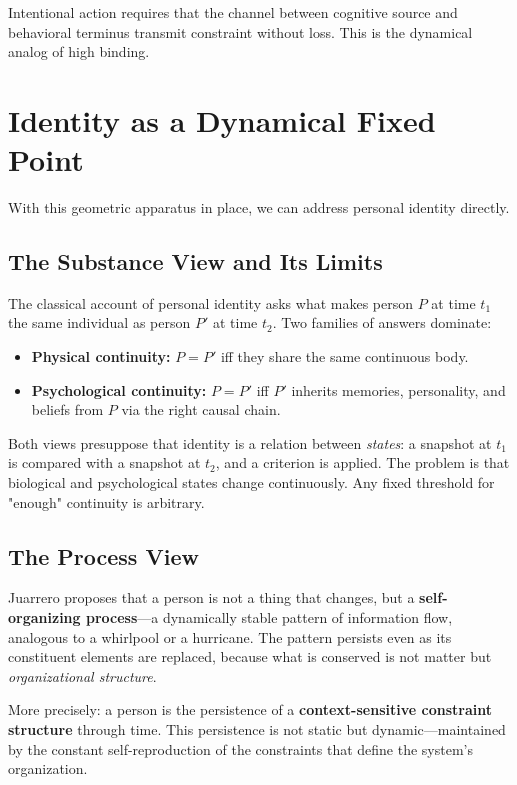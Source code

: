 \documentclass[11pt]{article}
\begin{document}
Intentional action requires that the channel between cognitive source and behavioral
terminus transmit constraint without loss. This is the dynamical analog of high binding.

\section{Identity as a Dynamical Fixed Point}

With this geometric apparatus in place, we can address personal identity directly.

\subsection{The Substance View and Its Limits}

The classical account of personal identity asks what makes person $P$ at time $t_1$ the
same individual as person $P'$ at time $t_2$. Two families of answers dominate:

\begin{itemize}
  \item \textbf{Physical continuity:} $P = P'$ iff they share the same continuous body.
  \item \textbf{Psychological continuity:} $P = P'$ iff $P'$ inherits memories,
        personality, and beliefs from $P$ via the right causal chain.
\end{itemize}

Both views presuppose that identity is a relation between \emph{states}: a snapshot at
$t_1$ is compared with a snapshot at $t_2$, and a criterion is applied. The problem is
that biological and psychological states change continuously. Any fixed threshold for
"enough" continuity is arbitrary.

\subsection{The Process View}

Juarrero proposes that a person is not a thing that changes, but a \textbf{self-organizing
process}—a dynamically stable pattern of information flow, analogous to a whirlpool or a
hurricane. The pattern persists even as its constituent elements are replaced, because
what is conserved is not matter but \emph{organizational structure}.

More precisely: a person is the persistence of a \textbf{context-sensitive constraint
structure} through time. This persistence is not static but dynamic—maintained by the
constant self-reproduction of the constraints that define the system's organization.
\end{document}
